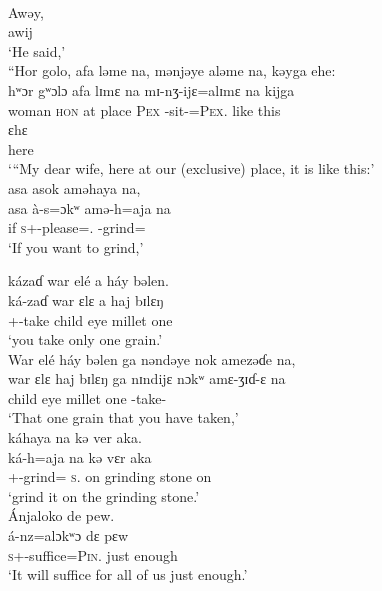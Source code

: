 \clearpage
\ea \label{ex:8:29}\\
Awəy,\\      
  awij\\
\glt  ‘He said,’\\
\medskip
“Hor  golo,  afa  ləme  na,  mənjəye  aləme  na,  kəyga  ehe:\\
\gll  hʷɔr gʷɔlɔ afa lɪmɛ na mɪ-nʒ-ijɛ=alɪmɛ na kijga\\ 
      woman  \textsc{hon}   {at place}   \textsc{Pex}   {\PSP} {\NOM}{}-sit-{\CL}=\textsc{Pex}.{\POSS}  {\PSP}   {like this} \\ 
      
      \medskip
\gll ɛhɛ\\
     here\\
\glt  ‘“My dear wife, here at our (exclusive) place, it is like this:’\\
\medskip
asa  asok  aməhaya  na,\\
\gll  asa à-s=ɔkʷ amə-h=aja na\\
      if   \textsc{s}+{\PFV}-please={\twoS}.{\IO}   {\DEP}-grind={\PLU}   {\PSP}\\
\glt ‘If you want to grind,’
      
\medskip
kázaɗ  war  elé  a  háy  bəlen.\\  
\gll  ká-zaɗ war ɛlɛ a haj  bɪlɛŋ\\
      {\twoS}+{\IFV}-take    child    eye  {\GEN}  millet  one\\
\glt  ‘you take only one grain.’  \\

\medskip
War  elé  háy  bəlen  ga  nəndəye  nok  amezəɗe  na,\\  
\gll  war ɛlɛ haj bɪlɛŋ ga nɪndijɛ nɔkʷ amɛ-ʒɪɗ{}-ɛ na\\
      child    eye  millet  one  {\ADJ}  {\DEM}    {\twoS}    {\DEP}-take-{\CL}  {\PSP} \\ 
\glt ‘That one grain that you have taken,’\\      
      
\medskip
káhaya  na  kə  ver  aka.\\   
\gll  ká-h=aja na kə vɛr aka\\
      {\twoS}+{\IFV}-grind={\PLU} \textsc{s}.{\DO} on {grinding stone} on\\
\glt  ‘grind it on the grinding stone.’\\

\medskip
Ánjaloko  de  pew.\\ 
\gll  á-nz=alɔkʷɔ dɛ pɛw \\
      \textsc{s}+{\IFV}-suffice=\textsc{Pin}.{\IO}  just   enough\\
\glt  ‘It will suffice for all of us just enough.’\\

